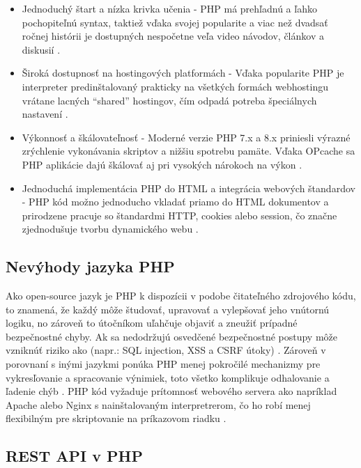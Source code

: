 \begin{itemize}
  \item Jednoduchý štart a nízka krivka učenia - PHP má prehľadnú a ľahko pochopiteľnú syntax, taktiež vďaka svojej
  popularite a viac než dvadsať ročnej histórii je dostupných nespočetne veľa video návodov, článkov a diskusií \cite{php_manual}.
  
  \item Široká dostupnosť na hostingových platformách - Vďaka popularite PHP je interpreter predinštalovaný 
  prakticky na všetkých formách webhostingu vrátane lacných ``shared'' hostingov, čím odpadá potreba špeciálnych 
  nastavení \cite{php_manual}.

  \item Výkonnosť a škálovateľnosť - Moderné verzie PHP 7.x a 8.x priniesli výrazné zrýchlenie vykonávania skriptov a 
  nižšiu spotrebu pamäte. Vďaka OPcache sa PHP aplikácie dajú škálovať aj pri vysokých nárokoch na 
  výkon \cite{free_programming_books}.
  
  \item Jednoduchá implementácia PHP do HTML a integrácia webových štandardov - PHP kód možno jednoducho vkladať priamo do HTML dokumentov a 
  prirodzene pracuje so štandardmi HTTP, cookies alebo session, čo značne zjednodušuje tvorbu dynamického webu \cite{php_manual}.
\end{itemize}

\subsection{Nevýhody jazyka PHP}
Ako open-source jazyk je PHP k dispozícii v podobe čitateľného zdrojového kódu, to znamená, že každý môže študovať, 
upravovať a vylepšovať jeho vnútornú logiku, no zároveň to útočníkom uľahčuje objaviť a zneužiť prípadné bezpečnostné 
chyby. Ak sa nedodržujú osvedčené bezpečnostné postupy môže vzniknúť riziko ako (napr.: SQL injection, XSS a CSRF 
útoky) \cite{tutorialspoint_php_introduction}. Zároveň v porovnaní s inými jazykmi ponúka PHP menej pokročilé mechanizmy pre 
vykresľovanie a spracovanie výnimiek, toto všetko komplikuje odhalovanie a ľadenie chýb \cite{geeksforgeeks_php_vs_aspnet}.
PHP kód vyžaduje prítomnosť webového servera ako napríklad Apache alebo Nginx s nainštalovaným interpretrerom, čo ho robí menej 
flexibilným pre skriptovanie na príkazovom riadku \cite{tutorialspoint_php_introduction}.

\subsection{REST API v PHP}

